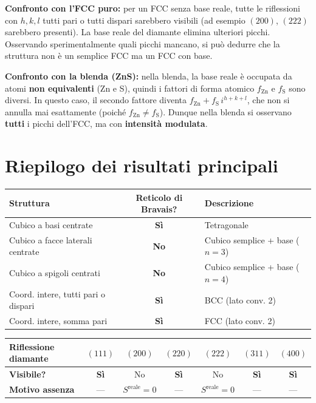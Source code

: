 \begin{nota}
\textbf{Confronto con l'FCC puro:} per un FCC senza base reale, tutte le riflessioni con $h, k, l$ tutti pari o tutti dispari sarebbero visibili (ad esempio $(200)$, $(222)$ sarebbero presenti). La base reale del diamante elimina ulteriori picchi. Osservando sperimentalmente quali picchi mancano, si può dedurre che la struttura non è un semplice FCC ma un FCC con base.

\textbf{Confronto con la blenda (ZnS):} nella blenda, la base reale è occupata da atomi \textbf{non equivalenti} (Zn e S), quindi i fattori di forma atomico $f_{\text{Zn}}$ e $f_{\text{S}}$ sono diversi. In questo caso, il secondo fattore diventa $f_{\text{Zn}} + f_{\text{S}}\, i^{h+k+l}$, che non si annulla mai esattamente (poiché $f_{\text{Zn}} \neq f_{\text{S}}$). Dunque nella blenda si osservano \textbf{tutti} i picchi dell'FCC, ma con \textbf{intensità modulata}.
\end{nota}

\section*{Riepilogo dei risultati principali}

\begin{table}[h!]
\centering
\renewcommand{\arraystretch}{1.3}
\begin{tabularx}{\textwidth}{|X|c|X|}
\hline
\textbf{Struttura} & \textbf{Reticolo di Bravais?} & \textbf{Descrizione} \\ \hline
Cubico a basi centrate & \textbf{Sì} & Tetragonale \\ \hline
Cubico a facce laterali centrate & \textbf{No} & Cubico semplice + base ($n = 3$) \\ \hline
Cubico a spigoli centrati & \textbf{No} & Cubico semplice + base ($n = 4$) \\ \hline
Coord. intere, tutti pari o dispari & \textbf{Sì} & BCC (lato conv. 2) \\ \hline
Coord. intere, somma pari & \textbf{Sì} & FCC (lato conv. 2) \\ \hline
\end{tabularx}
\end{table}

\begin{table}[h!]
\centering
\renewcommand{\arraystretch}{1.3}
\begin{tabularx}{\textwidth}{|X|c|c|c|c|c|c|}
\hline
\textbf{Riflessione diamante} & \textbf{$(111)$} & \textbf{$(200)$} & \textbf{$(220)$} & \textbf{$(222)$} & \textbf{$(311)$} & \textbf{$(400)$} \\ \hline
\textbf{Visibile?} & \textbf{Sì} & No & \textbf{Sì} & No & \textbf{Sì} & \textbf{Sì} \\ \hline
\textbf{Motivo assenza} & --- & $S^{\text{reale}} \!=\! 0$ & --- & $S^{\text{reale}} \!=\! 0$ & --- & --- \\ \hline
\end{tabularx}
\end{table}
